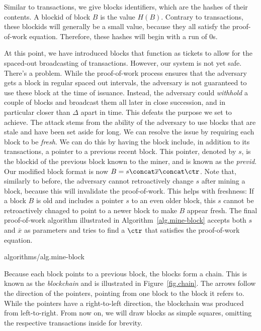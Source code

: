 Similar to transactions, we give blocks identifiers, which are the hashes of their contents.
A blockid of block $B$ is the value $H(B)$. Contrary to transactions, these blockids will
generally be a small value, because they all satisfy the proof-of-work equation. Therefore,
these hashes will begin with a run of $0$s.

At this point, we have introduced blocks that function as tickets to allow for the spaced-out
broadcasting of transactions. However, our system is not yet safe. There's a problem. While
the proof-of-work process ensures that the adversary gets a block in regular spaced out
intervals, the adversary is not guaranteed to use these block at the time of issuance.
Instead, the adversary could \emph{withhold} a couple of blocks and broadcast them all later
in close succession, and in particular closer than $\Delta$ apart in time. This defeats the
purpose we set to achieve. The attack stems from the ability of the adversary to use blocks
that are stale and have been set aside for long. We can resolve the issue by requiring
each block to be \emph{fresh}. We can do this by having the block include, in addition to
its transactions, a pointer to a previous recent block. This pointer, denoted by $s$,
is the blockid of the previous block known to the miner, and is known as the \emph{previd}.
Our modified block format is now $B = s \concat \overline{x} \concat \ctr$. Note that,
similarly to before, the adversary cannot retroactively change $s$ after mining a block,
because this will invalidate the proof-of-work. This helps with freshness: If a block $B$ is
old and includes a pointer $s$ to an even older block, this $s$ cannot be retroactively
chnaged to point to a newer block to make $B$ appear fresh. The final proof-of-work algorithm
illustrated in Algorithm~\ref{alg.mine-block}
accepts both $s$ and $\overline{x}$ as parameters and tries to find a $\ctr$ that
satisfies the proof-of-work equation.

{algorithms/alg.mine-block}

Because each block points to a previous block, the blocks form a chain. This is known
as the \emph{blockchain} and is illustrated in Figure~\ref{fig.chain}.
The arrows follow the direction of the pointers, pointing from one block to the block
it refers to. While the pointers have a right-to-left direction, the blockchain was
produced from left-to-right. From now on, we will draw blocks as simple squares,
omitting the respective transactions inside for brevity.

